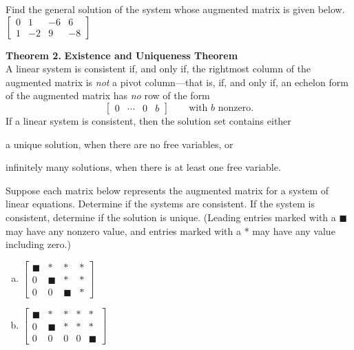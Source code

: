 \begin{exercise} %
Find the general solution of the system whose augmented matrix is given below. \\

$\begin{bmatrix}
0 &  1 & -6 &  6 \\
1 & -2 &  9 & -8
\end{bmatrix}$
\end{exercise}
\vfill


\newpage


\begin{boxthm}
\textbf{Theorem 2.}
\textbf{Existence and Uniqueness Theorem} \\
A linear system is consistent if, and only if, the rightmost column of the augmented matrix is \textit{not} a pivot column---that is, if, and only if, an echelon form of the augmented matrix has \textit{no} row of the form
$$ \begin{bmatrix}0 & \cdots & 0 & b\end{bmatrix} \qquad \text{with $b$ nonzero}.$$
If a linear system is consistent, then the solution set contains either 
\begin{enumerate*}[(i)]
	\item a unique solution, when there are no free variables, or
	\item infinitely many solutions, when there is at least one free variable.
\end{enumerate*}
\end{boxthm}


\begin{exercise} %
Suppose each matrix below represents the augmented matrix for a system of linear equations. Determine if the systems are consistent. If the system is consistent, determine if the solution is unique. (Leading entries marked with a $\blacksquare$ may have any nonzero value, and entries marked with a * may have any value including zero.)
\begin{multicols}{2}
	\begin{enumerate}[(a)]
		\item
				$\begin{bmatrix}
				\blacksquare	& *				& *				& * \\ 
				0				& \blacksquare	& *				& * \\ 
				0				& 0				& \blacksquare	& *
				\end{bmatrix}$
		\item	
				$\begin{bmatrix}
				\blacksquare	& *				& *	& * & * \\ 
				0				& \blacksquare	& *	& * & * \\ 
				0				& 0				& 0	& 0 & \blacksquare
				\end{bmatrix}$
	\end{enumerate}
\end{multicols}
\end{exercise}
\vfill


